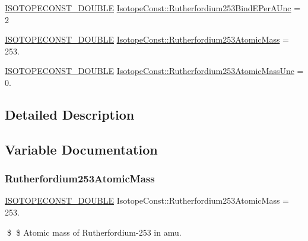 \begin{DoxyCompactItemize}
\item 
\mbox{\hyperlink{group___isotope_const-_macros_ga8f45a7272ce02c0b4c65c44636ed719a}{I\+S\+O\+T\+O\+P\+E\+C\+O\+N\+S\+T\+\_\+\+D\+O\+U\+B\+LE}} \mbox{\hyperlink{group___isotope_const-_rutherfordium-_rf253_gaf5b07fdbce5cbaf54c4fee0a973f35c1}{Isotope\+Const\+::\+Rutherfordium253\+Bind\+E\+Per\+A\+Unc}} = 2
\item 
\mbox{\hyperlink{group___isotope_const-_macros_ga8f45a7272ce02c0b4c65c44636ed719a}{I\+S\+O\+T\+O\+P\+E\+C\+O\+N\+S\+T\+\_\+\+D\+O\+U\+B\+LE}} \mbox{\hyperlink{group___isotope_const-_rutherfordium-_rf253_gaecf7600edc7735089842f0f999d1cd71}{Isotope\+Const\+::\+Rutherfordium253\+Atomic\+Mass}} = 253.
\item 
\mbox{\hyperlink{group___isotope_const-_macros_ga8f45a7272ce02c0b4c65c44636ed719a}{I\+S\+O\+T\+O\+P\+E\+C\+O\+N\+S\+T\+\_\+\+D\+O\+U\+B\+LE}} \mbox{\hyperlink{group___isotope_const-_rutherfordium-_rf253_ga4c861d46c78496a5b917ccc95d55c059}{Isotope\+Const\+::\+Rutherfordium253\+Atomic\+Mass\+Unc}} = 0.
\end{DoxyCompactItemize}


\subsection{Detailed Description}


\subsection{Variable Documentation}
\mbox{\label{group___isotope_const-_rutherfordium-_rf253_gaecf7600edc7735089842f0f999d1cd71}} 
\subsubsection{\texorpdfstring{Rutherfordium253\+Atomic\+Mass}{Rutherfordium253AtomicMass}}
{\footnotesize\ttfamily \mbox{\hyperlink{group___isotope_const-_macros_ga8f45a7272ce02c0b4c65c44636ed719a}{I\+S\+O\+T\+O\+P\+E\+C\+O\+N\+S\+T\+\_\+\+D\+O\+U\+B\+LE}} Isotope\+Const\+::\+Rutherfordium253\+Atomic\+Mass = 253.}

\$ \$ Atomic mass of Rutherfordium-\/253 in amu. \mbox{\label{group___isotope_const-_rutherfordium-_rf253_ga4c861d46c78496a5b917ccc95d55c059}} 
